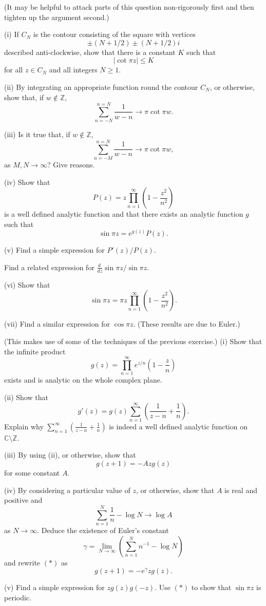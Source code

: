 \begin{exercise} (It may be helpful to attack parts
of this question non-rigorously first and then tighten up
the argument second.)

(i) If $C_{N}$ is the contour consisting of the square
with vertices
\[\pm (N+1/2)\pm (N+1/2)i\]
described
anti-clockwise, show that there is a constant $K$
such that
\[|\cot \pi z|\leq K\]
for all $z\in C_{N}$ and all integers $N\geq 1$.

(ii) By integrating an appropriate function round the
contour $C_{N}$, or otherwise,
show that, if $w\notin{\mathbb Z}$,
\[\sum_{n=-N}^{n=N}\frac{1}{w-n}\rightarrow  \pi\cot\pi w.\]

(iii) Is it true that, if $w\notin{\mathbb Z}$,
\[\sum_{n=-M}^{n=N}\frac{1}{w-n}\rightarrow  \pi\cot\pi w,\]
as $M,N\rightarrow\infty$? Give reasons.

(iv) Show that
\[P(z)=z\prod_{n=1}^{\infty}\left(1-\frac{z^{2}}{n^{2}}\right)\]
is a well defined analytic function and that there exists
an analytic function $g$ such that
\[\sin\pi z=e^{g(z)}P(z).\]

(v) Find a simple expression for
$P'(z)/P(z)$.

\noindent[Hint: If $p(z)=\prod_{j=1}^{N}(z-\alpha_{j})$,
what is $p'(z)/p(z)$?]

Find a related expression for
$\frac{d\ }{dz}\sin \pi z/\sin \pi z$.

(vi) Show that
\[\sin\pi z=\pi z\prod_{n=1}^{\infty}\left(1-\frac{z^{2}}{n^{2}}\right).\]

(vii) Find a similar expression for $\cos\pi z$. (These
results are due to Euler.)
\end{exercise}
\begin{exercise} (This makes use of some of the
techniques of the previous exercise.) (i) Show that the infinite product
\[g(z)=\prod_{n=1}^{\infty}e^{z/n}\left(1-\frac{z}{n}\right)\]
exists and is analytic on the whole complex plane.

(ii) Show that
\[g'(z)=g(z)
\sum_{n=1}^{\infty}\left(\frac{1}{z-n}+\frac{1}{n}\right).\]
Explain why $\sum_{n=1}^{\infty}(\frac{1}{z-n}+\frac{1}{n})$
is indeed a well defined analytic function on
${\mathbb C}\setminus{\mathbb Z}$.

(iii) By using (ii), or otherwise, show that
\begin{equation*}
g(z+1)=-Azg(z) \tag*{($*$)}
\end{equation*}
for some constant $A$.

(iv) By considering a particular value of $z$, or otherwise,
show that $A$ is real and positive and
\[\sum_{n=1}^{N}\frac{1}{n}-\log N\rightarrow \log A\]
as $N\rightarrow\infty$.
Deduce the existence of Euler's constant
\[\gamma=\lim_{N\rightarrow\infty}
\left(\sum_{n=1}^{N}n^{-1}-\log N\right)\]
and rewrite $(*)$ as
\begin{equation*}
g(z+1)=-e^{\gamma}zg(z).
\end{equation*}

(v) Find a simple expression for $zg(z)g(-z)$. Use $(*)$
to show that $\sin \pi z$ is periodic.
\end{exercise}
